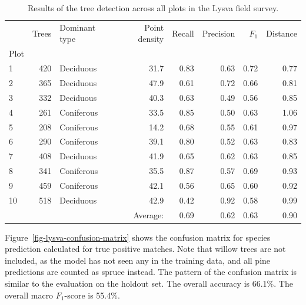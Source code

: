 \begin{table}
    \centering
    \caption{Results of the tree detection across all plots in the Lysva field survey.}
    \label{tbl-detection-results}
    \begin{tabular}{lrlrrrrr}
    \toprule
     & Trees & Dominant type & Point density & Recall & Precision & $F_1$ & Distance \\
    Plot &  &  &  &  &  &  & \\
    \midrule
    1 & 420 & Deciduous & 31.7 & 0.83 & 0.63 & 0.72 & 0.77 \\
    2 & 365 & Deciduous & 47.9 & 0.61 & 0.72 & 0.66 & 0.81 \\
    3 & 332 & Deciduous & 40.3 & 0.63 & 0.49 & 0.56 & 0.85 \\
   4 & 261 & Coniferous & 33.5 & 0.85 & 0.50 & 0.63 & 1.06 \\
   5 & 208 & Coniferous & 14.2 & 0.68 & 0.55 & 0.61 & 0.97 \\
   6 & 290 & Coniferous & 39.1 & 0.80 & 0.52 & 0.63 & 0.83 \\
    7 & 408 & Deciduous & 41.9 & 0.65 & 0.62 & 0.63 & 0.85 \\
   8 & 341 & Coniferous & 35.5 & 0.87 & 0.57 & 0.69 & 0.93 \\
   9 & 459 & Coniferous & 42.1 & 0.56 & 0.65 & 0.60 & 0.92 \\
   10 & 518 & Deciduous & 42.9 & 0.42 & 0.92 & 0.58 & 0.99 \\
    \midrule
    & & & Average: & 0.69 & 0.62 & 0.63 & 0.90 \\
    \bottomrule
    \end{tabular}
\end{table}

Figure~\ref{fig-lysva-confusion-matrix} shows the confusion matrix for species prediction calculated for true positive matches.
Note that willow trees are not included, as the model has not seen any in the training data, and all pine predictions are counted as spruce instead.
The pattern of the confusion matrix is similar to the evaluation on the holdout set.
The overall accuracy is 66.1\%.
The overall macro $F_1$-score is 55.4\%.

